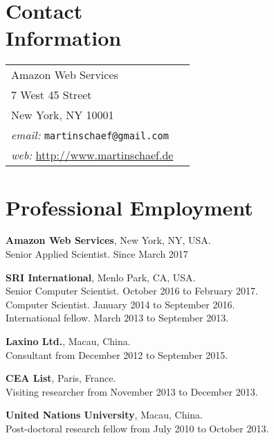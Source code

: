 \documentclass[margin,line]{res}
\begin{document}

\begin{resume}
\section{\sc Contact\\ Information}

\begin{tabular}{@{}p{3in}p{4in}}
Amazon Web Services  & \\%
7 West 45 Street &\\
New York, NY 10001 & \\
\emph{email:}  \texttt{martinschaef@gmail.com} & \\
\emph{web:} \url{http://www.martinschaef.de} & \\
\end{tabular}



%

\section{\sc Professional Employment}

\textbf{Amazon Web Services}, New York, NY, USA.\\
 Senior Applied Scientist. Since March 2017

\textbf{SRI International}, Menlo Park, CA, USA.\\
 Senior Computer Scientist. October 2016 to February 2017. \\
 Computer Scientist. January 2014 to September 2016. \\
 International fellow. March 2013 to September 2013.

\textbf{Laxino Ltd.}, Macau, China.\\
Consultant from December 2012 to September 2015.

\textbf{CEA List}, Paris, France.\\
Visiting researcher from November 2013 to December 2013.

\textbf{United Nations University}, Macau, China.\\
Post-doctoral research fellow from July 2010 to October 2013.


\end{resume}
\end{document}
